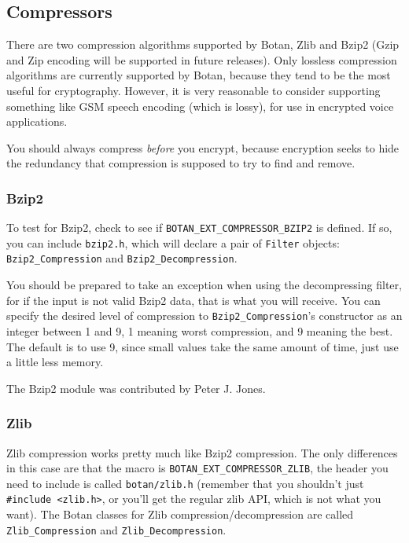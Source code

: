 \documentclass{article}
\newcommand{\filename}[1]{\texttt{#1}}
\newcommand{\macro}[1]{\texttt{#1}}
\newcommand{\type}[1]{\texttt{#1}}
\begin{document}
\subsection{Compressors}

There are two compression algorithms supported by Botan, Zlib and Bzip2 (Gzip
and Zip encoding will be supported in future releases). Only lossless
compression algorithms are currently supported by Botan, because they tend to
be the most useful for cryptography. However, it is very reasonable to consider
supporting something like GSM speech encoding (which is lossy), for use in
encrypted voice applications.

You should always compress \emph{before} you encrypt, because encryption seeks
to hide the redundancy that compression is supposed to try to find and remove.

\subsubsection{Bzip2}

To test for Bzip2, check to see if \macro{BOTAN\_EXT\_COMPRESSOR\_BZIP2} is
defined. If so, you can include \filename{bzip2.h}, which will declare a pair
of \type{Filter} objects: \type{Bzip2\_Compression} and
\type{Bzip2\_Decompression}.

You should be prepared to take an exception when using the decompressing
filter, for if the input is not valid Bzip2 data, that is what you will
receive. You can specify the desired level of compression to
\type{Bzip2\_Compression}'s constructor as an integer between 1 and 9, 1
meaning worst compression, and 9 meaning the best. The default is to use 9,
since small values take the same amount of time, just use a little less memory.

The Bzip2 module was contributed by Peter J. Jones.

\subsubsection{Zlib}

Zlib compression works pretty much like Bzip2 compression. The only differences
in this case are that the macro is \macro{BOTAN\_EXT\_COMPRESSOR\_ZLIB}, the
header you need to include is called \filename{botan/zlib.h} (remember that you
shouldn't just \verb|#include <zlib.h>|, or you'll get the regular zlib API,
which is not what you want). The Botan classes for Zlib
compression/decompression are called \type{Zlib\_Compression} and
\type{Zlib\_Decompression}.
\end{document}

